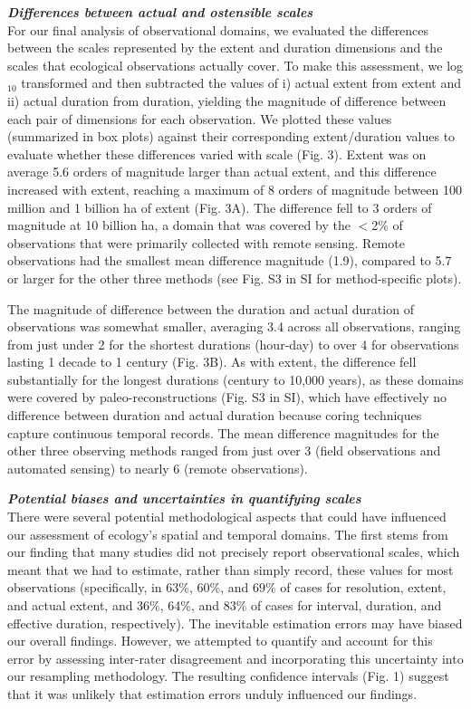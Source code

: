 \documentclass[12pt]{article}
\begin{document}
\noindent \textbf{\emph{Differences between actual and ostensible scales}}\\
For our final analysis of observational domains, we evaluated the differences between the scales represented by the extent and duration dimensions and the scales that ecological observations actually cover. To make this assessment, we log$_{10}$ transformed and then subtracted the values of i) actual extent from extent and ii) actual duration from duration, yielding the magnitude of difference between each pair of dimensions for each observation. We plotted these values (summarized in box plots) against their corresponding extent/duration values to evaluate whether these differences varied with scale (Fig. 3). Extent was on average 5.6 orders of magnitude larger than actual extent, and this difference increased with extent, reaching a maximum of 8 orders of magnitude between 100 million and 1 billion ha of extent (Fig. 3A). The difference fell to 3 orders of magnitude at 10 billion ha, a domain that was covered by the $<$2\% of observations that were primarily collected with remote sensing. Remote observations had the smallest mean difference magnitude (1.9), compared to 5.7 or larger for the other three methods (see Fig. S3 in SI for method-specific plots). 

The magnitude of difference between the duration and actual duration of observations was somewhat smaller, averaging 3.4 across all observations, ranging from just under 2 for the shortest durations (hour-day) to over 4 for observations lasting 1 decade to 1 century (Fig. 3B). As with extent, the difference fell substantially for the longest durations (century to 10,000 years), as these domains were covered by paleo-reconstructions (Fig. S3 in SI), which have effectively no difference between duration and actual duration because coring techniques capture continuous temporal records. The mean difference magnitudes for the other three observing methods ranged from just over 3 (field observations and automated sensing) to nearly 6 (remote observations). 

\noindent \textbf{\emph{Potential biases and uncertainties in quantifying scales}}\\
There were several potential methodological aspects that could have influenced our assessment of ecology's spatial and temporal domains. The first stems from our finding that many studies did not precisely report observational scales, which meant that we had to estimate, rather than simply record, these values for most observations (specifically, in 63\%, 60\%, and 69\% of cases for resolution, extent, and actual extent, and 36\%, 64\%, and 83\% of cases for interval, duration, and effective duration, respectively). The inevitable estimation errors may have biased our overall findings. However, we attempted to quantify and account for this error by assessing inter-rater disagreement and incorporating this uncertainty into our resampling methodology. The resulting confidence intervals (Fig. 1) suggest that it was unlikely that estimation errors unduly influenced our findings. 
\end{document}
